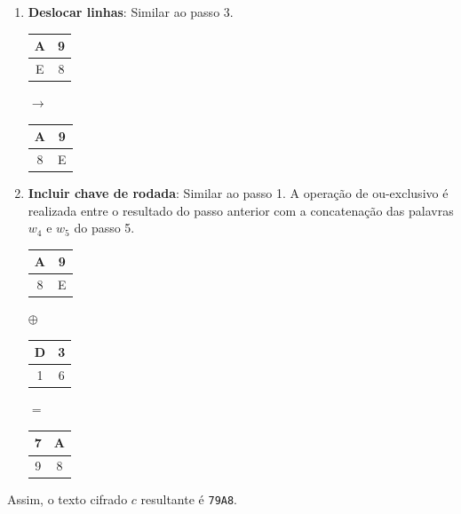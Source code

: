 \documentclass{article}
\begin{document}
\begin{enumerate}
    \item \textbf{Deslocar linhas}: Similar ao passo 3.
    \begin{center}
        \begin{tabular}{|c|c|}
            \hline
            A & 9  \\
            \hline
            E & 8 \\
            \hline
        \end{tabular}
        $\to$
        \begin{tabular}{|c|c|}
            \hline
            A & 9  \\
            \hline
            8 & E \\
            \hline
        \end{tabular}
    \end{center}
    
    \item \textbf{Incluir chave de rodada}: Similar ao passo 1. A operação de
    ou-exclusivo é realizada entre o resultado do passo anterior com a
    concatenação das palavras $w_{4}$ e $w_{5}$ do passo 5.
        \begin{center}
        \begin{tabular}{|c|c|}
            \hline
            A & 9  \\
            \hline
            8 & E \\
            \hline
        \end{tabular}
        $\oplus$
        \begin{tabular}{|c|c|}
            \hline
            D & 3  \\
            \hline
            1 & 6 \\
            \hline
        \end{tabular}
        $=$
        \begin{tabular}{|c|c|}
            \hline
            7 & A  \\
            \hline
            9 & 8 \\
            \hline
        \end{tabular}
    \end{center}
\end{enumerate}
Assim, o texto cifrado $c$ resultante é \texttt{79A8}.
\end{document}

